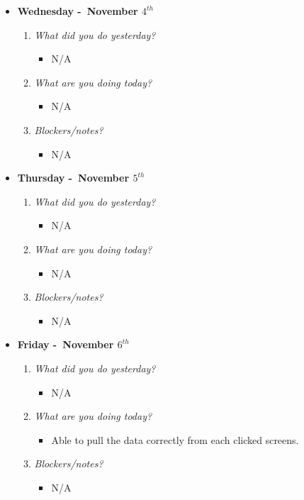 \begin{itemize}
  \item[] \textbf{\large Wednesday -\ November \(4^{th}\)}
  \begin{enumerate}
    \item \textsl{What did you do yesterday?}
    \begin{itemize}
      \item N/A
    \end{itemize}
    \item \textsl{What are you doing today?}
    \begin{itemize}
      \item N/A
    \end{itemize}
    \item \textsl{Blockers/notes?}
    \begin{itemize}
      \item N/A
    \end{itemize}
  \end{enumerate}
\end{itemize}
\textbf{}
\begin{itemize}
  \item[] \textbf{\large Thursday -\ November \(5^{th}\)}
  \begin{enumerate}
    \item \textsl{What did you do yesterday?}
    \begin{itemize}
      \item N/A
    \end{itemize}
    \item \textsl{What are you doing today?}
    \begin{itemize}
      \item N/A
    \end{itemize}
    \item \textsl{Blockers/notes?}
    \begin{itemize}
      \item N/A
    \end{itemize}
  \end{enumerate}
\end{itemize}
\textbf{}
\begin{itemize}
  \item[] \textbf{\large Friday -\ November \(6^{th}\)}
  \begin{enumerate}
    \item \textsl{What did you do yesterday?}
    \begin{itemize}
      \item N/A
    \end{itemize}
    \item \textsl{What are you doing today?}
    \begin{itemize}
      \item Able to pull the data correctly from each clicked screens.
    \end{itemize}
    \item \textsl{Blockers/notes?}
    \begin{itemize}
      \item N/A
    \end{itemize}
  \end{enumerate}
\end{itemize}

